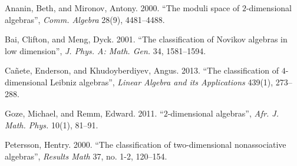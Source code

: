 \documentclass[autowc]{CUP-JNL-PPS}
\begin{document}
\begin{Backmatter}
\begin{thebibliography}{}
{Ananin, Beth, and Mironov, Antony}. 2000. ``The moduli space of $2$-dimensional algebras'', \textit{Comm. Algebra} {28}(9),  {4481}--{4488}.

{Bai, Clifton, and Meng, Dyck}. 2001. ``The classification of Novikov algebras in low dimension'',  \textit{J. Phys. A: Math. Gen.} {34}, {1581}--{1594}.

{Ca\~{n}ete, Enderson, and Khudoyberdiyev, Angus}. 2013. ``The classification of $4$-dimensional Leibniz algebras'',  \textit{Linear Algebra and its Applications}  {439}(1), {273}--{288}.

{Goze, Michael, and Remm, Edward}. 2011.  ``$2$-dimensional algebras'',  \textit{Afr. J. Math. Phys.} {10}(1),  {81}--{91}.

{Petersson, Hentry}. 2000. ``The classification of two-dimensional nonassociative algebras'',  \textit{Results Math} {37}, no. 1-2,  {120}--{154}.

\end{thebibliography}

\end{Backmatter}
\end{document}
